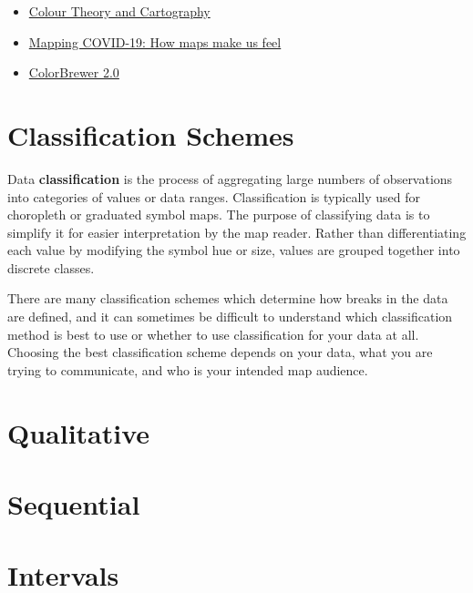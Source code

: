 \documentclass[
]{book}
\begin{document}
\begin{itemize}
\item
  \href{https://openpress.usask.ca/introgeomatics/part/colour-theory-and-cartography/}{Colour Theory and Cartography}
\item
  \href{https://www.canadiangeographic.ca/article/mapping-covid-19-how-maps-make-us-feel}{Mapping COVID-19: How maps make us feel}
\item
  \href{https://colorbrewer2.org/\#type=sequential\&scheme=BuGn\&n=3}{ColorBrewer 2.0}
\end{itemize}

\hypertarget{classification-schemes}{%
\section{Classification Schemes}\label{classification-schemes}}

Data \textbf{classification} is the process of aggregating large numbers of observations into categories of values or data ranges. Classification is typically used for choropleth or graduated symbol maps. The purpose of classifying data is to simplify it for easier interpretation by the map reader. Rather than differentiating each value by modifying the symbol hue or size, values are grouped together into discrete classes.

There are many classification schemes which determine how breaks in the data are defined, and it can sometimes be difficult to understand which classification method is best to use or whether to use classification for your data at all. Choosing the best classification scheme depends on your data, what you are trying to communicate, and who is your intended map audience.

\hypertarget{qualitative}{%
\section{Qualitative}\label{qualitative}}

\hypertarget{sequential}{%
\section{Sequential}\label{sequential}}

\hypertarget{intervals}{%
\section{Intervals}\label{intervals}}
\end{document}
